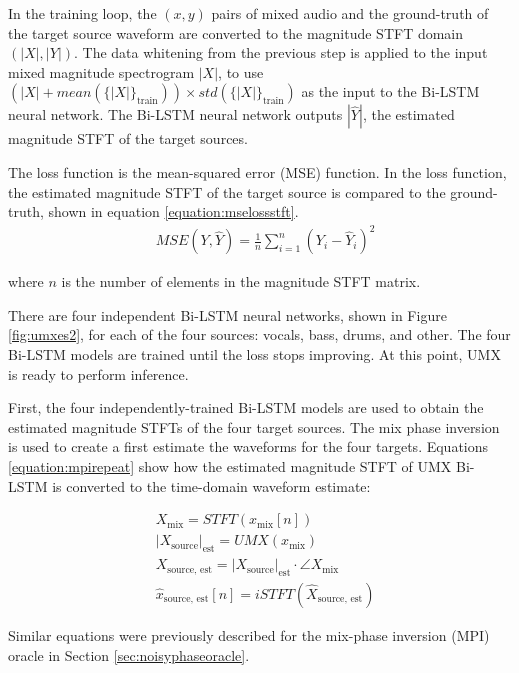 \documentclass[report.tex]{subfiles}
\begin{document}
In the training loop, the $(x, y)$ pairs of mixed audio and the ground-truth of the target source waveform are converted to the magnitude STFT domain $(|X|, |Y|)$. The data whitening from the previous step is applied to the input mixed magnitude spectrogram $|X|$, to use $(|X|+\mathit{mean}(\{|X|\}_{\text{train}}))\times\mathit{std}(\{|X|\}_{\text{train}})$ as the input to the Bi-LSTM neural network. The Bi-LSTM neural network outputs $|\hat{Y}|$, the estimated magnitude STFT of the target sources.

The loss function is the mean-squared error (MSE) function. In the loss function, the estimated magnitude STFT of the target source is compared to the ground-truth, shown in equation \eqref{equation:mselossstft}.
\begin{align}\tag{31}\label{equation:mselossstft}
	\nonumber & \mathit{MSE}(Y, \hat{Y}) = \frac{1}{n} \sum_{i = 1}^{n}{(Y_{i}-\hat{Y}_{i})^{2}}
\end{align}

where $n$ is the number of elements in the magnitude STFT matrix.

There are four independent Bi-LSTM neural networks, shown in Figure \ref{fig:umxes2}, for each of the four sources: vocals, bass, drums, and other. The four Bi-LSTM models are trained until the loss stops improving. At this point, UMX is ready to perform inference.

First, the four independently-trained Bi-LSTM models are used to obtain the estimated magnitude STFTs of the four target sources. The mix phase inversion is used to create a first estimate the waveforms for the four targets. Equations \eqref{equation:mpirepeat} show how the estimated magnitude STFT of UMX Bi-LSTM is converted to the time-domain waveform estimate:

\begin{align}\tag{32}\label{equation:mpirepeat}
	\nonumber & X_{\text{mix}} = \mathit{STFT}(x_{\text{mix}}[n])\\
	\nonumber & {|X_{\text{source}}|}_{\text{est}} = \mathit{UMX}(x_{\text{mix}})\\
	\nonumber & X_{\text{source, est}} = {|X_{\text{source}}|}_{\text{est}} \cdot \angle{X_{\text{mix}}}\\
	\nonumber & \hat{x}_{\text{source, est}}[n] = \mathit{iSTFT}(\hat{X}_{\text{source, est}})
\end{align}

Similar equations were previously described for the mix-phase inversion (MPI) oracle in Section \ref{sec:noisyphaseoracle}.
\end{document}
